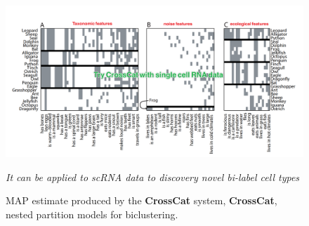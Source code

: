 \begin{figure}[htpb]
    \centering
    \includegraphics[width=\textwidth]{figs/crosscat.png}
    \caption{MAP estimate produced by the \textbf{CrossCat} system, \textbf{CrossCat}, nested partition models for biclustering.}
    \textit{It can be applied to scRNA data to discovery novel bi-label cell types}
    \label{fig:crosscat}
\end{figure}